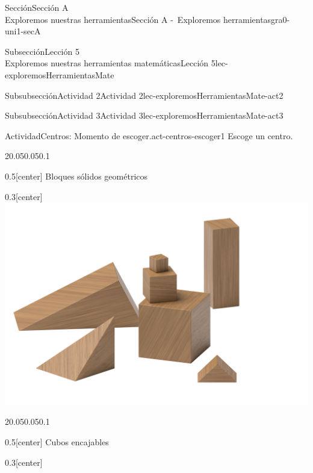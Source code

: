 \begin{sectionptx}{Sección}{{\Large Sección A\\}Exploremos nuestras herramientas}{}{Sección A -~Exploremos herramientas}{}{}{gra0-uni1-secA}
\begin{subsectionptx}{Subsección}{{\normalsize Lección 5\\[-0.05cm]}Exploremos nuestras herramientas matemáticas}{}{Lección 5}{}{}{lec-exploremosHerramientasMate}
\begin{subsubsectionptx}{Subsubsección}{Actividad 2}{}{Actividad 2}{}{}{lec-exploremosHerramientasMate-act2}
\end{subsubsectionptx}
%
%
\typeout{************************************************}
\typeout{************************************************}
%
\clearpage
\begin{subsubsectionptx}{Subsubsección}{Actividad 3}{}{Actividad 3}{}{}{lec-exploremosHerramientasMate-act3}
\begin{activity}{Actividad}{Centros: Momento de escoger.}{act-centros-escoger1}%
Escoge un centro.%
\begin{sidebyside}{2}{0.05}{0.05}{0.1}%
\begin{sbspanel}{0.5}[center]%
Bloques sólidos geométricos%
\end{sbspanel}%
\begin{sbspanel}{0.3}[center]%
\includegraphics[max width=\linewidth, center]{external/png-source/K.1.A Beta Student Workbook.Geoblocks.png}
\end{sbspanel}%
\end{sidebyside}%
\begin{sidebyside}{2}{0.05}{0.05}{0.1}%
\begin{sbspanel}{0.5}[center]%
Cubos encajables%
\end{sbspanel}%
\begin{sbspanel}{0.3}[center]%

\end{sbspanel}
\end{sidebyside}
\end{activity}
\end{subsubsectionptx}
\end{subsectionptx}
\end{sectionptx}
